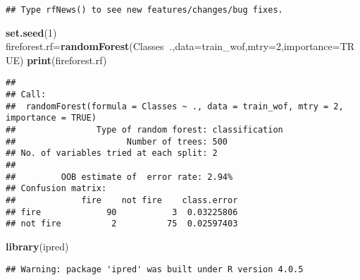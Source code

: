 \documentclass[
]{article}
\newenvironment{Shaded}{\begin{snugshade}}{\end{snugshade}}
\newcommand{\ControlFlowTok}[1]{\textcolor[rgb]{0.13,0.29,0.53}{\textbf{#1}}}
\newcommand{\DataTypeTok}[1]{\textcolor[rgb]{0.13,0.29,0.53}{#1}}
\newcommand{\DecValTok}[1]{\textcolor[rgb]{0.00,0.00,0.81}{#1}}
\newcommand{\KeywordTok}[1]{\textcolor[rgb]{0.13,0.29,0.53}{\textbf{#1}}}
\newcommand{\NormalTok}[1]{#1}
\newcommand{\OperatorTok}[1]{\textcolor[rgb]{0.81,0.36,0.00}{\textbf{#1}}}
\newcommand{\OtherTok}[1]{\textcolor[rgb]{0.56,0.35,0.01}{#1}}
\begin{document}
\begin{verbatim}
## Type rfNews() to see new features/changes/bug fixes.
\end{verbatim}

\begin{Shaded}
\begin{Highlighting}[]
\KeywordTok{set.seed}\NormalTok{(}\DecValTok{1}\NormalTok{)}
\NormalTok{fireforest.rf=}\KeywordTok{randomForest}\NormalTok{(Classes}\OperatorTok{~}\NormalTok{.,}\DataTypeTok{data=}\NormalTok{train_wof,}\DataTypeTok{mtry=}\DecValTok{2}\NormalTok{,}\DataTypeTok{importance=}\OtherTok{TRUE}\NormalTok{)}
\KeywordTok{print}\NormalTok{(fireforest.rf)}
\end{Highlighting}
\end{Shaded}

\begin{verbatim}
## 
## Call:
##  randomForest(formula = Classes ~ ., data = train_wof, mtry = 2,      importance = TRUE) 
##                Type of random forest: classification
##                      Number of trees: 500
## No. of variables tried at each split: 2
## 
##         OOB estimate of  error rate: 2.94%
## Confusion matrix:
##             fire    not fire    class.error
## fire             90           3  0.03225806
## not fire          2          75  0.02597403
\end{verbatim}

\begin{Shaded}
\begin{Highlighting}[]
\KeywordTok{library}\NormalTok{(ipred)}
\end{Highlighting}
\end{Shaded}

\begin{verbatim}
## Warning: package 'ipred' was built under R version 4.0.5
\end{verbatim}

\begin{Shaded}
\end{Shaded}
\end{document}

